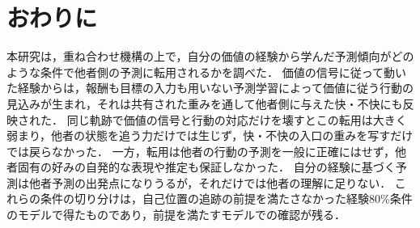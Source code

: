 \section{おわりに}\label{sec:conclusion}
本研究は，重ね合わせ機構\cite{noguchi2022superposition}の上で，自分の価値の経験から学んだ予測傾向がどのような条件で他者側の予測に転用されるかを調べた．
価値の信号に従って動いた経験からは，報酬も目標の入力も用いない予測学習によって価値に従う行動の見込みが生まれ，それは共有された重みを通して他者側に与えた快・不快にも反映された．
同じ軌跡で価値の信号と行動の対応だけを壊すとこの転用は大きく弱まり，他者の状態を追う力だけでは生じず，快・不快の入口の重みを写すだけでは戻らなかった．
一方，転用は他者の行動の予測を一般に正確にはせず，他者固有の好みの自発的な表現や推定も保証しなかった．
自分の経験に基づく予測は他者予測の出発点になりうるが，それだけでは他者の理解に足りない．
これらの条件の切り分けは，自己位置の追跡の前提を満たさなかった経験80\%条件のモデルで得たものであり，前提を満たすモデルでの確認が残る．
